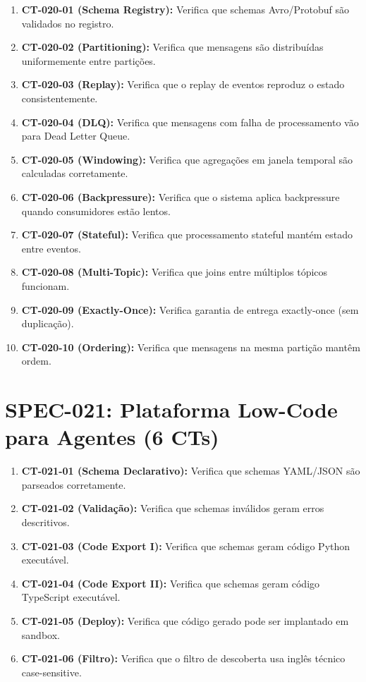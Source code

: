 \begin{enumerate}
  \item \textbf{CT-020-01 (Schema Registry):} Verifica que schemas Avro/Protobuf são validados no registro.
  \item \textbf{CT-020-02 (Partitioning):} Verifica que mensagens são distribuídas uniformemente entre partições.
  \item \textbf{CT-020-03 (Replay):} Verifica que o replay de eventos reproduz o estado consistentemente.
  \item \textbf{CT-020-04 (DLQ):} Verifica que mensagens com falha de processamento vão para Dead Letter Queue.
  \item \textbf{CT-020-05 (Windowing):} Verifica que agregações em janela temporal são calculadas corretamente.
  \item \textbf{CT-020-06 (Backpressure):} Verifica que o sistema aplica backpressure quando consumidores estão lentos.
  \item \textbf{CT-020-07 (Stateful):} Verifica que processamento stateful mantém estado entre eventos.
  \item \textbf{CT-020-08 (Multi-Topic):} Verifica que joins entre múltiplos tópicos funcionam.
  \item \textbf{CT-020-09 (Exactly-Once):} Verifica garantia de entrega exactly-once (sem duplicação).
  \item \textbf{CT-020-10 (Ordering):} Verifica que mensagens na mesma partição mantêm ordem.
\end{enumerate}

\section{SPEC-021: Plataforma Low-Code para Agentes (6 CTs)}

\begin{enumerate}
  \item \textbf{CT-021-01 (Schema Declarativo):} Verifica que schemas YAML/JSON são parseados corretamente.
  \item \textbf{CT-021-02 (Validação):} Verifica que schemas inválidos geram erros descritivos.
  \item \textbf{CT-021-03 (Code Export I):} Verifica que schemas geram código Python executável.
  \item \textbf{CT-021-04 (Code Export II):} Verifica que schemas geram código TypeScript executável.
  \item \textbf{CT-021-05 (Deploy):} Verifica que código gerado pode ser implantado em sandbox.
  \item \textbf{CT-021-06 (Filtro):} Verifica que o filtro de descoberta usa inglês técnico case-sensitive.
\end{enumerate}


